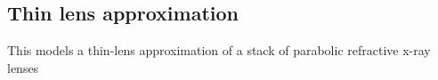 \subsection*{Thin lens approximation}
\label{s:lens-simple}

This models a thin-lens approximation of a stack of parabolic refractive x-ray lenses
